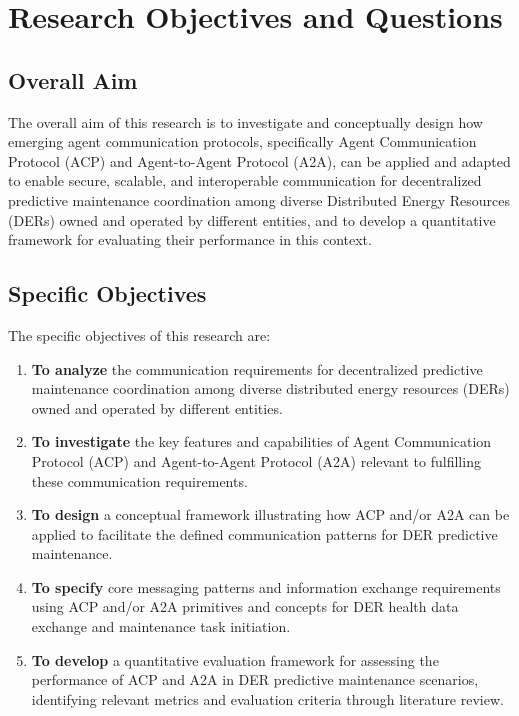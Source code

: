 
\section{Research Objectives and Questions}
\label{sec:objectives}

\subsection{Overall Aim}

The overall aim of this research is to investigate and conceptually design how emerging agent communication protocols, specifically Agent Communication Protocol (ACP) and Agent-to-Agent Protocol (A2A), can be applied and adapted to enable secure, scalable, and interoperable communication for decentralized predictive maintenance coordination among diverse Distributed Energy Resources (DERs) owned and operated by different entities, and to develop a quantitative framework for evaluating their performance in this context.

\subsection{Specific Objectives}

The specific objectives of this research are:
\begin{enumerate}
    \item \textbf{To analyze} the communication requirements for decentralized predictive maintenance coordination among diverse distributed energy resources (DERs) owned and operated by different entities.
    \item \textbf{To investigate} the key features and capabilities of Agent Communication Protocol (ACP) and Agent-to-Agent Protocol (A2A) relevant to fulfilling these communication requirements.
    \item \textbf{To design} a conceptual framework illustrating how ACP and/or A2A can be applied to facilitate the defined communication patterns for DER predictive maintenance.
    \item \textbf{To specify} core messaging patterns and information exchange requirements using ACP and/or A2A primitives and concepts for DER health data exchange and maintenance task initiation.
    \item \textbf{To develop} a quantitative evaluation framework for assessing the performance of ACP and A2A in DER predictive maintenance scenarios, identifying relevant metrics and evaluation criteria through literature review.
\end{enumerate}

